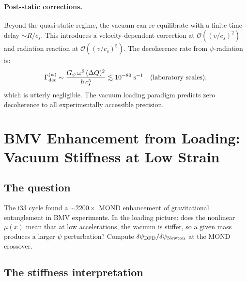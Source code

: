 \documentclass[11pt,a4paper]{article}
\newcommand{\order}{\mathcal{O}}
\begin{document}
\paragraph{Post-static corrections.}
Beyond the quasi-static regime, the vacuum can re-equilibrate with a
finite time delay $\sim R/c_s$.  This introduces a
velocity-dependent correction at $\order((v/c_s)^2)$ and radiation
reaction at $\order((v/c_s)^5)$.  The decoherence rate from
$\psi$-radiation is:
\begin{equation}
\Gamma_{\rm dec}^{(\psi)} \sim
\frac{G_\psi\,\omega^6\,(\Delta Q)^2}{\hbar\,c_s^5}
\lesssim 10^{-80}\;\text{s}^{-1}
\quad\text{(laboratory scales)},
\end{equation}
which is utterly negligible.  The vacuum loading paradigm predicts
zero decoherence to all experimentally accessible precision.


\section{BMV Enhancement from Loading: Vacuum Stiffness at Low Strain}
\label{sec:BMV-enhancement}

\subsection{The question}

The i33 cycle found a $\sim 2200\times$ MOND enhancement of gravitational
entanglement in BMV experiments.  In the loading picture: does the nonlinear
$\mu(x)$ mean that at low accelerations, the vacuum is stiffer, so a given
mass produces a larger $\psi$ perturbation?  Compute
$\delta\psi_{\rm DFD}/\delta\psi_{\rm Newton}$ at the MOND crossover.

\subsection{The stiffness interpretation}
\end{document}
